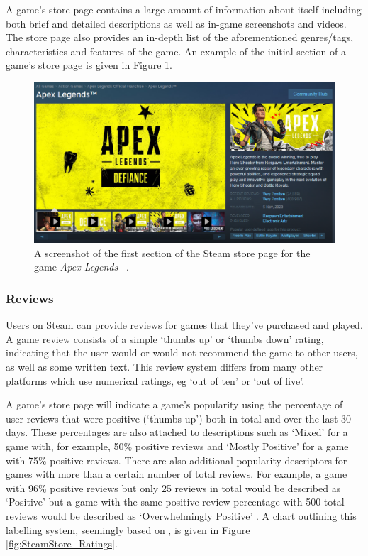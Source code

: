 A game's store page contains a large amount of information about itself including both brief and detailed descriptions as well as in-game screenshots and videos. The store page also provides an in-depth list of the aforementioned genres/tags, characteristics and features of the game. An example of the initial section of a game's store page is given in Figure \ref{fig:SteamStore_ApexLegends}.

\begin{figure}[ht]
    \centering
    \includegraphics[scale=0.6]{figures/02_background/01_SteamStore_ApexLegends.png}
    \caption{A screenshot of the first section of the Steam store page for the game \textit{Apex Legends}\texttrademark~ \cite{SteamApexLegends}.}
    \label{fig:SteamStore_ApexLegends}
\end{figure}

\subsubsection{Reviews}

Users on Steam can provide reviews for games that they've purchased and played. A game review consists of a simple `thumbs up' or `thumbs down' rating, indicating that the user would or would not recommend the game to other users, as well as some written text. This review system differs from many other platforms which use numerical ratings, eg `out of ten' or `out of five'.

A game's store page will indicate a game's popularity using the percentage of user reviews that were positive (`thumbs up') both in total and over the last 30 days. These percentages are also attached to descriptions such as `Mixed' for a game with, for example, 50\% positive reviews and `Mostly Positive' for a game with 75\% positive reviews. There are also additional popularity descriptors for games with more than a certain number of total reviews. For example, a game with 96\% positive reviews but only 25 reviews in total would be described as `Positive' but a game with the same positive review percentage with 500 total reviews would be described as `Overwhelmingly Positive' \cite{SteamRatingsArticle}. A chart outlining this labelling system, seemingly based on \cite{SteamRatingsArticle}, is given in Figure \ref{fig:SteamStore_Ratings}.

